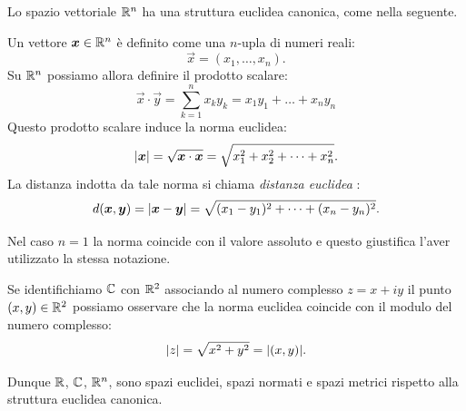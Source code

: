 Lo spazio vettoriale ${\mathbb R}^n$ ha una struttura euclidea canonica,
come nella seguente.

\begin{definition}%
\label{def:124124}%
\mymark{*}%
Un vettore $\boldsymbol x\in {\mathbb R}^n$ è definito come una $n$-upla di numeri reali:
\[
  \vec x = (x_1, \dots, x_n).
\]
Su ${\mathbb R}^n$ possiamo allora definire il prodotto scalare:
\[
  \vec x\cdot \vec y
   = \sum_{k=1}^n x_k y_k
   = x_1 y_1 + \dots + x_n y_n
\]
Questo prodotto scalare induce la norma euclidea:
%
\[
  {\left|\boldsymbol x\right|} = \sqrt{\boldsymbol x \cdot \boldsymbol x}
  = \sqrt{x_1^2 + x_2^2+ \dots + x_n^2}.
\]
La distanza indotta da tale norma si chiama \emph{distanza euclidea}%
%
:
\[
  d(\boldsymbol x, \boldsymbol y)
  = {\left|\boldsymbol x-\boldsymbol y\right|}
  = \sqrt{(x_1-y_1)^2 + \dots + (x_n-y_n)^2}.
\]

Nel caso $n=1$ la norma coincide con il valore assoluto e questo
giustifica l'aver utilizzato la stessa notazione.

Se identifichiamo ${\mathbb C}$ con ${\mathbb R}^2$ associando al numero complesso $z=x+iy$
il punto $(x,y)\in {\mathbb R}^2$ possiamo osservare che la norma euclidea
coincide con il modulo del numero complesso:
\[
  {\left|z\right|} = \sqrt{x^2 + y^2} = {\left|(x,y)\right|}.
\]

Dunque ${\mathbb R}$, ${\mathbb C}$, ${\mathbb R}^n$,
sono spazi euclidei, spazi normati e spazi metrici rispetto alla struttura
euclidea canonica.
\end{definition}

